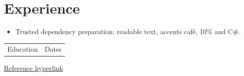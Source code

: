 \documentclass[11pt,a4paper]{article}
\begin{document}
\section*{Experience}
\begin{itemize}[leftmargin=*,nosep]
\item Trusted dependency preparation: readable text, accents caf\'e, 10\% and C\#.
\end{itemize}
\begin{tabularx}{\textwidth}{Xr}Education & Dates\end{tabularx}
\href{https://example.org}{Reference hyperlink}
\end{document}
